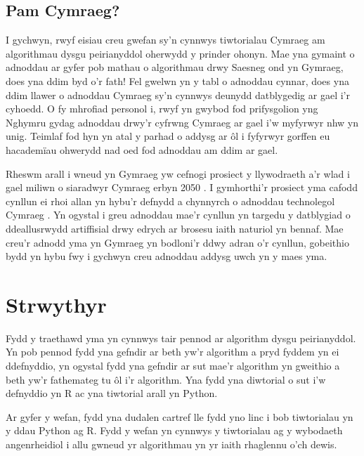 \subsection{Pam Cymraeg?}

I gychwyn, rwyf eisiau creu gwefan sy'n cynnwys tiwtorialau Cymraeg am algorithmau dysgu peirianyddol oherwydd y prinder ohonyn. Mae yna gymaint o adnoddau ar gyfer pob mathau o algorithmau drwy Saesneg ond yn Gymraeg, does yna ddim byd o'r fath! Fel gwelwn yn y tabl o adnoddau cynnar, does yna ddim llawer o adnoddau Cymraeg sy'n cynnwys deunydd datblygedig ar gael i'r cyhoedd. O fy mhrofiad personol i, rwyf yn gwybod fod prifysgolion yng Nghymru gydag adnoddau drwy'r cyfrwng Cymraeg ar gael i'w myfyrwyr nhw yn unig. Teimlaf fod hyn yn atal y parhad o addysg ar \^{o}l i fyfyrwyr gorffen eu hacadem\"{i}au ohwerydd nad oed fod adnoddau am ddim ar gael.  

Rheswm arall i wneud yn Gymraeg yw cefnogi prosiect y llywodraeth a'r wlad i gael miliwn o siaradwyr Cymraeg erbyn 2050 \cite{cymraeg2050}. I gymhorthi'r prosiect yma cafodd cynllun ei rhoi allan yn hybu'r defnydd a chynnyrch o adnoddau technolegol Cymraeg \cite{cymraeg2050tech}. Yn ogystal i greu adnoddau mae'r cynllun yn targedu y datblygiad o ddeallusrwydd artiffisial drwy edrych ar brosesu iaith naturiol yn bennaf. Mae creu'r adnodd yma yn Gymraeg yn bodloni'r ddwy adran o'r cynllun, gobeithio bydd yn hybu fwy i gychwyn creu adnoddau addysg uwch yn y maes yma. 

\section{Strwythyr}

Fydd y traethawd yma yn cynnwys tair pennod ar algorithm dysgu peirianyddol. Yn pob pennod fydd yna gefndir ar beth yw'r algorithm a pryd fyddem yn ei ddefnyddio, yn ogystal fydd yna gefndir ar sut mae'r algorithm yn gweithio a beth yw'r fathemateg tu \^{o}l i'r algorithm. Yna fydd yna diwtorial o sut i'w defnyddio yn R ac yna tiwtorial arall yn Python.

Ar gyfer y wefan, fydd yna dudalen cartref lle fydd yno linc i bob tiwtorialau yn y ddau Python ag R. Fydd y wefan yn cynnwys y tiwtorialau ag y wybodaeth angenrheidiol i allu gwneud yr algorithmau yn yr iaith rhaglennu o'ch dewis.

